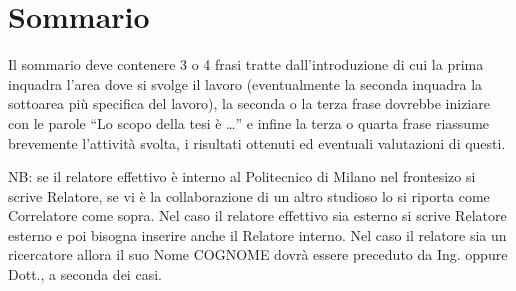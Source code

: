 \newpage
\chapter{Sommario}

Il sommario deve contenere 3 o 4 frasi tratte dall'introduzione di cui la prima inquadra l'area dove si svolge il lavoro (eventualmente la seconda inquadra la sottoarea pi\`u specifica del lavoro), la seconda o la terza frase dovrebbe iniziare con le parole ``Lo scopo della tesi \`e \dots'' e infine la terza o quarta frase riassume brevemente l'attivit\`a svolta, i risultati ottenuti ed eventuali valutazioni di questi.

\vspace{0.5cm}
\noindent NB: se il relatore effettivo \`e interno al Politecnico di Milano nel frontesizo si scrive Relatore, se vi \`e la collaborazione di un altro studioso lo si riporta come Correlatore come sopra. Nel caso il relatore effettivo sia esterno si scrive Relatore esterno e poi bisogna inserire anche il Relatore interno. Nel caso il relatore sia un ricercatore allora il suo Nome COGNOME dovr\`a essere preceduto da Ing. oppure Dott., a seconda dei casi.
